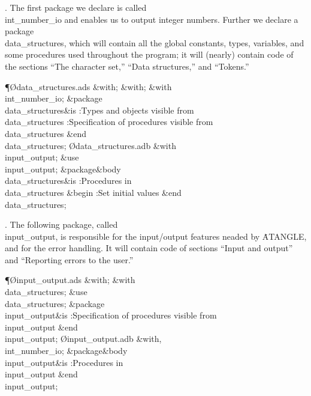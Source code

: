 \fi

\*. The first package we declare is called \\{int\_number\_io} and enables
us
to output integer numbers. Further we declare a package \\{data\_structures},
which will contain all the global constants, types, variables, and some
procedures used throughout the program; it will (nearly) contain code of
the sections ``The character set,'' ``Data structures,'' and ``Tokens.''

\Y\P\O{data\_structures.ads}\?\6
\?\&{with}\8;\6
\&{with}\8;\6
\&{with}\8\\{int\_number\_io};\6
\&{package}\8\1\\{data\_structures}\2\8\&{is}\8\1\6
:Types and objects visible from \\{data\_structures}\X\6
:Specification of procedures visible from \\{data\_structures}\X\2\6
\&{end}\8\\{data\_structures};\7
\O{data\_structures.adb}\?\6
\?\&{with}\8\\{input\_output};\6
\&{use}\8\\{input\_output};\6
\&{package}\8\1\&{body}\8\\{data\_structures}\2\8\&{is}\8\1\6
:Procedures in \\{data\_structures}\X\6
\4\&{begin}\6
:Set initial values\X\2\6
\&{end}\8\\{data\_structures};\par
\fi

\*. The following package, called \\{input\_output}, is responsible for the
input/output features neaded by \.{ATANGLE}, and for the error handling.
It will contain code of sections ``Input and output'' and ``Reporting
errors to the user.''

\Y\P\O{input\_output.ads}\?\6
\?\&{with}\8;\6
\&{with}\8\\{data\_structures};\6
\&{use}\8\\{data\_structures};\6
\&{package}\8\1\\{input\_output}\2\8\&{is}\8\1\6
:Specification of procedures visible from \\{input\_output}\X\2\6
\&{end}\8\\{input\_output};\7
\O{input\_output.adb}\?\6
\?\&{with}\8\?,\?\\{int\_number\_io};\6
\&{package}\8\1\&{body}\8\\{input\_output}\2\8\&{is}\8\1\6
:Procedures in \\{input\_output}\X\2\6
\&{end}\8\\{input\_output};\par
\fi

